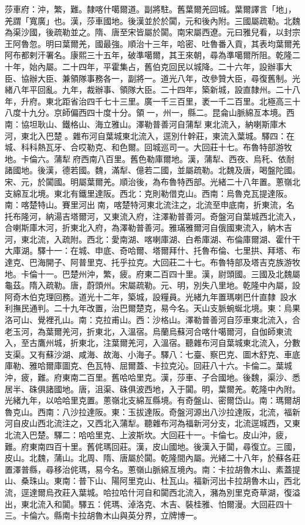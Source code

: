 \begin{pinyinscope}
莎車府：沖，繁，難。隸喀什噶爾道。副將駐。舊葉爾羌回城。葉爾譯言「地」，羌謂「寬廣」也。漢，莎車國地。後漢並於於闐，元和後內附。三國屬疏勒。北魏為渠沙國，後疏勒並之。隋、唐至宋皆屬於闐。南宋屬西遼。元曰雅兒看，以封宗王阿魯忽。明曰葉爾羌，國最強。順治十三年，哈密、吐魯番入貢，其表均葉爾羌阿布都剌汗署名。康熙三十五年，破準噶爾，其王來朝，尋為準噶爾所阻。乾隆二十年，始內屬。二十四年，平霍集占，舊伯克回民以城降。二十六年，設辦事大臣、協辦大臣、兼領隊事務各一，副將一。道光八年，改參贊大臣，尋復舊制。光緒八年平回亂。九年，裁辦事、領隊大臣。二十四年，築新城，設直隸州。二十八年，升府。東北距省治四千七十三里。廣一千三百里，袤一千二百里。北極高三十八度十九分。京師偏西四十度十分。領一，州一，縣二。昆侖山脈綿亙本境。西南：協坦耿山、鐵格山、海立雅山。澤勒普善河自蒲犁東北流入，納喇斯庫木河，東北入巴楚。雜布河自葉城東北流入，逕別什幹莊，東流入葉城。驛四：在城、科科熱瓦牙、合哎勒克、和色爾。回城巡司一。大回莊十七。布魯特部游牧地。卡倫六。蒲犁府西南八百里。舊色勒庫爾地。漢，蒲犁、西夜、烏秅、依耐諸國地。後漢，德若國。魏，滿犁、億若二國，並屬疏勒。北魏及唐，喝盤陀國。宋、元，於闐國。明屬葉爾羌。順治後，為布魯特西部。光緒二十八年置。蔥嶺北支綿亙北境。東北有鐵里達阪。西北：克則勒借克山。西南：烏魯克瓦提達阪。南：喀楚特山。賽里河出南，喀楚特河東北流注之，北流至申底南，折東流，名托布隆河，納湯吉塔爾河，又東流入府，注澤勒普善河。奇盤河自葉城西北流入，合喇斯庫木河，折東北入府，為澤勒普善河。雅璊雅爾河自俄國東流入，納木吉河，東北流，入疏附。西北：愛南湖、喀喇庫湖、白希庫湖、布倫庫爾湖、霍什干大庫湖。驛十一：在城、申底、奇哈爾、塔爾拜什、托魯布倫、七里拱、拜塔、布達克、巴海開子、阿普里克、托乎拉克。大回莊二十七。布魯特部及塔吉克族游牧地。卡倫十一。巴楚州沖，繁，疲。府東二百四十里。漢，尉頭國。三國及北魏屬龜茲。隋入疏勒。唐，蔚頭州。宋屬疏勒。元、明，別失八里地。乾隆中內屬，設阿奇木伯克理回務。道光十二年，築城，設糧員。光緒九年置瑪喇巴什直隸，設水利撫民通判。二十九年改置，治巴爾楚克，易今名。天山支脈蜿蜒北境。東：烏果洛可山、覺裡孔山。南：克拉甫山。西：沙格山。澤勒普善河自莎車東北流入，合老玉河，為葉爾羌河，折東北，入溫宿。烏蘭烏蘇河合喀什噶爾河，自伽師東流入，至古鷹州城，折東北，注葉爾羌河，入溫宿。聽雜布河自葉城東北流入，分數支渠。又有蘇沙湖、咸海、故海、小海子。驛八：七臺、察巴克、圖木舒克、車底庫勒、雅哈爾庫圖克、色瓦特、屈爾蓋、卡拉克沁。回莊八十六。卡倫二。葉城沖，疲，難。府東南二百里。舊哈哈里克。漢，莎車、子合國地。後魏，渠沙、悉居半、硃俱諸國地。唐，沮渠、硃俱波西地，入于闐。明，葉爾羌。乾隆中內附。光緒九年，以哈哈里克置。蔥嶺北支綿亙縣境。有奇盤山、密爾岱山。南：瑪爾胡魯克山。西南：八沙拉達阪。東：玉拔達阪。奇盤河源出八沙拉達阪，北流，福新河自皮山西北流注之，又西北入蒲犁。聽雜布河為福新河分支，北流逕城西，又東北流入巴楚。驛二：哈哈里克、上波斯坎。大回莊十一。卡倫七。皮山沖，疲，難。府東南四百十里。舊侂瑪回莊。漢，皮山國地。後漢入于闐，尋復立。三國，皮山。北魏，蒲山。北周、隋、唐屬於闐。乾隆間內屬。光緒二十八年，於蘇各莊置澤普縣，尋移治侂瑪，易今名。蔥嶺山脈綿亙境內。南：卡拉胡魯木山、素蓋提山、桑珠山。東南：普下山、陽阿里克山、杜瓦山。福新河出卡拉胡魯木山，西北流，逕達爾烏孜莊入葉城。哈拉哈什河自和闐西北流入，瀦為別里克奇草湖，復溢出，東北流入和闐。驛五：侂瑪、淖洛克、木吉、裝桂雅、怕爾漫。大回莊四十三。卡倫六。縣南卡拉胡魯木山與英分界，立牌博一。


\end{pinyinscope}
